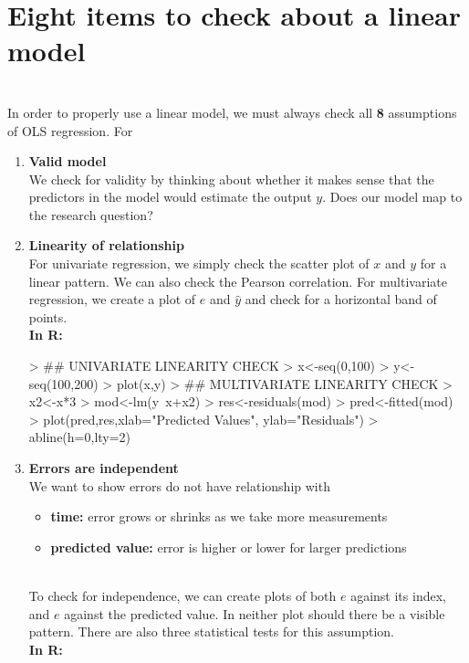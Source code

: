 \documentclass{article}
\begin{document}
\section{Eight items to check about a linear model}
  \\ In order to properly use a linear model, we must always check all \textbf{8} assumptions of OLS regression. For 
  \begin{enumerate}
    \item \textbf{Valid model}
      \\ We check for validity by thinking about whether it makes sense that the predictors in the model would estimate the output $y$. Does our model map to the research question?
    \item \textbf{Linearity of relationship}
      \\ For univariate regression, we simply check the scatter plot of $x$ and $y$ for a linear pattern. We can also check the Pearson correlation. For multivariate regression, we create a plot of $e$ and $\hat{y}$ and check for a horizontal band of points.
      \\ \textbf{In R:}
\begin{Schunk}
\begin{Sinput}
> ## UNIVARIATE LINEARITY CHECK
> x<-seq(0,100)
> y<-seq(100,200)
> plot(x,y)
> ## MULTIVARIATE LINEARITY CHECK
> x2<-x*3
> mod<-lm(y~x+x2)
> res<-residuals(mod)
> pred<-fitted(mod)
> plot(pred,res,xlab="Predicted Values", ylab="Residuals")
> abline(h=0,lty=2)
\end{Sinput}
\end{Schunk}
    \item \textbf{Errors are independent}
      \\ We want to show errors do not have relationship with
      \begin{itemize}
        \item \textbf{time:} error grows or shrinks as we take more measurements
        \item \textbf{predicted value:} error is higher or lower for larger predictions
      \end{itemize}
      \\ To check for independence, we can create plots of both $e$ against its index, and $e$ against the predicted value. In neither plot should there be a visible pattern. There are also three statistical tests for this assumption.
      \\ \textbf{In R:}
\begin{Schunk}
\begin{Sinput}

\end{Sinput}
\end{Schunk}
\end{enumerate}
\end{document}
